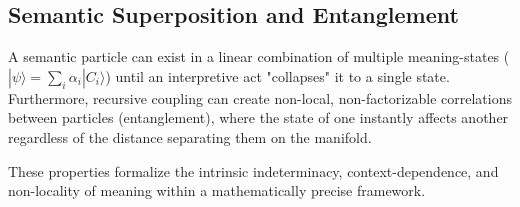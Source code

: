 
\subsection{Semantic Superposition and Entanglement}
\label{13.7.2:semantic_superposition_and_entanglement}

A semantic particle can exist in a linear combination of multiple meaning-states (\(|\psi\rangle = \sum_i \alpha_i |C_i\rangle\)) until an interpretive act "collapses" it to a single state. Furthermore, recursive coupling can create non-local, non-factorizable correlations between particles (entanglement), where the state of one instantly affects another regardless of the distance separating them on the manifold.

These properties formalize the intrinsic indeterminacy, context-dependence, and non-locality of meaning within a mathematically precise framework. 